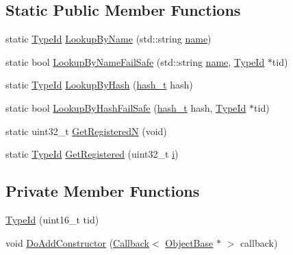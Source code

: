 \subsection*{Static Public Member Functions}
\begin{DoxyCompactItemize}
\item 
static \hyperlink{classns3_1_1TypeId}{Type\+Id} \hyperlink{classns3_1_1TypeId_a119cf99c20931fdc294602cd360b180e}{Lookup\+By\+Name} (std\+::string \hyperlink{generate__test__data__lte__spectrum__model_8m_ab74e6bf80237ddc4109968cedc58c151}{name})
\item 
static bool \hyperlink{classns3_1_1TypeId_acceab1f57bfe3c3af02130277d409f14}{Lookup\+By\+Name\+Fail\+Safe} (std\+::string \hyperlink{generate__test__data__lte__spectrum__model_8m_ab74e6bf80237ddc4109968cedc58c151}{name}, \hyperlink{classns3_1_1TypeId}{Type\+Id} $\ast$tid)
\item 
static \hyperlink{classns3_1_1TypeId}{Type\+Id} \hyperlink{classns3_1_1TypeId_a89c7bc12203e64d22c402ba4b49cfb07}{Lookup\+By\+Hash} (\hyperlink{classns3_1_1TypeId_ab3fc1475c4a0c2cfb35b976dbd609057}{hash\+\_\+t} hash)
\item 
static bool \hyperlink{classns3_1_1TypeId_a3b82356d8b073ce008c3254f175ecbc8}{Lookup\+By\+Hash\+Fail\+Safe} (\hyperlink{classns3_1_1TypeId_ab3fc1475c4a0c2cfb35b976dbd609057}{hash\+\_\+t} hash, \hyperlink{classns3_1_1TypeId}{Type\+Id} $\ast$tid)
\item 
static uint32\+\_\+t \hyperlink{classns3_1_1TypeId_a87c96c0c7ef389488be43aa4194f818a}{Get\+RegisteredN} (void)
\item 
static \hyperlink{classns3_1_1TypeId}{Type\+Id} \hyperlink{classns3_1_1TypeId_a19fe68b77ecc4e29c0637e543365affc}{Get\+Registered} (uint32\+\_\+t \hyperlink{lte__uplink__power__control_8m_a6f6ccfcf58b31cb6412107d9d5281426}{i})
\end{DoxyCompactItemize}
\subsection*{Private Member Functions}
\begin{DoxyCompactItemize}
\item 
\hyperlink{classns3_1_1TypeId_aa40fcff015c898c7987df0453cbbdf69}{Type\+Id} (uint16\+\_\+t tid)
\item 
void \hyperlink{classns3_1_1TypeId_aff073e36c2bf066811b30f6db69fe2ba}{Do\+Add\+Constructor} (\hyperlink{classns3_1_1Callback}{Callback}$<$ \hyperlink{classns3_1_1ObjectBase}{Object\+Base} $\ast$ $>$ callback)
\end{DoxyCompactItemize}
